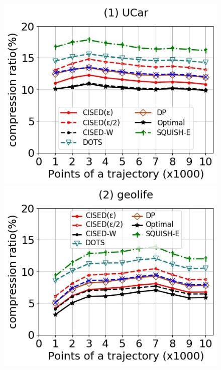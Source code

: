 \begin{figure}[tb!]
	\centering
	\includegraphics[scale=0.250]{Figures/Exp-SED-CR-size-service.jpg} 	\hspace{0.5ex}
	\includegraphics[scale=0.250]{Figures/Exp-SED-CR-size-geolife.jpg}	\hspace{0.5ex}

\end{figure}
